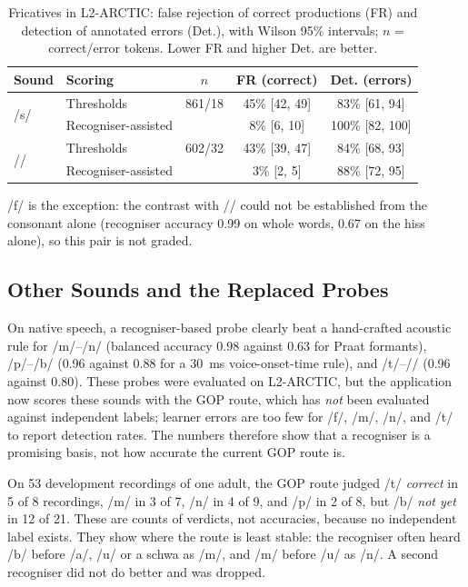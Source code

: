 \documentclass[engproc,article,submit,moreauthors]{Definitions/mdpi}
\newcommand{\ipa}[1]{/#1/}
\begin{document}
\begin{table}[!t]
\caption{Fricatives in L2-ARCTIC: false rejection of correct productions (FR) and detection of annotated errors (Det.), with Wilson 95\% intervals; $n$ = correct/error tokens. Lower FR and higher Det. are better.\label{tab:l2}}
\small
\begin{tabularx}{\textwidth}{llccc}
\toprule
\textbf{Sound} & \textbf{Scoring} & \textbf{$n$} & \textbf{FR (correct)} & \textbf{Det. (errors)}\\
\midrule
\multirow{2}{*}{\ipa{s}} & Thresholds & 861/18 & 45\% [42, 49] & 83\% [61, 94]\\
 & Recogniser-assisted & & 8\% [6, 10] & 100\% [82, 100]\\
\multirow{2}{*}{\ipa{\textesh}} & Thresholds & 602/32 & 43\% [39, 47] & 84\% [68, 93]\\
 & Recogniser-assisted & & 3\% [2, 5] & 88\% [72, 95]\\
\bottomrule
\end{tabularx}
\end{table}

\ipa{f} is the exception: the contrast with \ipa{\texttheta} could not be established from the consonant alone (recogniser accuracy 0.99 on whole words, 0.67 on the hiss alone), so this pair is not graded.

\subsection{Other Sounds and the Replaced Probes}
On native speech, a recogniser-based probe clearly beat a hand-crafted acoustic rule for \ipa{m}--\ipa{n} (balanced accuracy 0.98 against 0.63 for Praat formants), \ipa{p}--\ipa{b} (0.96 against 0.88 for a 30~ms voice-onset-time rule), and \ipa{t\textesh}--\ipa{\textesh} (0.96 against 0.80). These probes were evaluated on L2-ARCTIC, but the application now scores these sounds with the GOP route, which has \emph{not} been evaluated against independent labels; learner errors are too few for \ipa{f}, \ipa{m}, \ipa{n}, and \ipa{t\textesh} to report detection rates. The numbers therefore show that a recogniser is a promising basis, not how accurate the current GOP route is.

On 53 development recordings of one adult, the GOP route judged \ipa{t\textesh} \textit{correct} in 5 of 8 recordings, \ipa{m} in 3 of 7, \ipa{n} in 4 of 9, and \ipa{p} in 2 of 8, but \ipa{b} \textit{not yet} in 12 of 21. These are counts of verdicts, not accuracies, because no independent label exists. They show where the route is least stable: the recogniser often heard \ipa{b} before \ipa{a}, \ipa{u} or a schwa as \ipa{m}, and \ipa{m} before \ipa{u} as \ipa{n}. A second recogniser did not do better and was dropped.
\end{document}
